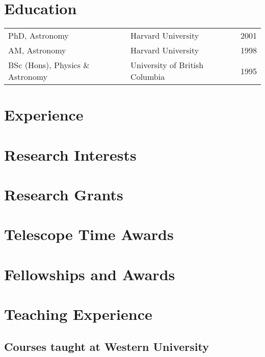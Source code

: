 \documentclass[12pt]{article}
\begin{document}
\maketitle

\section{Education}
\begin{tabularx}{\textwidth}{lXr}
PhD, Astronomy & Harvard University & 2001\\
AM, Astronomy & Harvard University & 1998\\
BSc (Hons),  Physics \& Astronomy & University of British Columbia&1995\\
\end{tabularx}

\section{Experience} 


\section{Research Interests}



\section{Research Grants}



\section{Telescope Time Awards}




\section{Fellowships and Awards}


\section{Teaching Experience}

\subsection{Courses taught at Western University}

\end{document}
